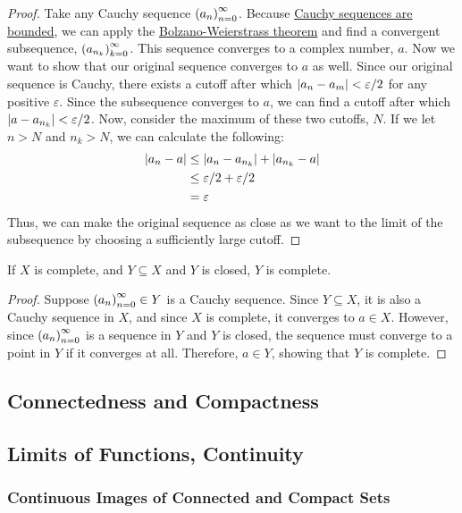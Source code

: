 \begin{proof}
Take any Cauchy sequence $\seq{a}$. Because \hyperlink{Cauchy Sequences are Bounded}{Cauchy sequences are bounded}, we can apply the \hyperlink{Bolzano-Weierstrass Theorem}{Bolzano-Weierstrass theorem} and find a convergent subsequence, $\seq{a}[n_k][k]$. This sequence converges to a complex number, $a$. Now we want to show that our original sequence converges to $a$ as well.
Since our original sequence is Cauchy, there exists a cutoff after which $\left\lvert a_n-a_m \right\rvert < \varepsilon/2$ for any positive $\varepsilon$. Since the subsequence converges to $a$, we can find a cutoff after which $\left\lvert a-a_{n_k} \right\rvert < \varepsilon/2$. Now, consider the maximum of these two cutoffs, $N$. If we let $n> N$ and $n_k>N$, we can calculate the following: 
\begin{align*}
\left\lvert a_n - a \right\rvert &\leq \left\lvert a_n-a_{n_k} \right\rvert + \left\lvert a_{n_k}-a \right\rvert\\ &\leq \varepsilon/2 +\varepsilon/2\\ &= \varepsilon
\end{align*}
Thus, we can make the original sequence as close as we want to the limit of the subsequence by choosing a sufficiently large cutoff.
\end{proof}
\begin{theorem}
If $X$ is complete, and $Y \subseteq X$ and $Y$ is closed, $Y$ is complete.
\end{theorem}
\begin{proof}
Suppose $\seq{a} \in Y$ is a Cauchy sequence. Since $Y \subseteq X$, it is also a Cauchy sequence in $X$, and since $X$ is complete, it converges to $a \in X$. However, since $\seq{a}$ is a sequence in $Y$ and $Y$ is closed, the sequence must converge to a point in $Y$ if it converges at all. Therefore, $a \in Y$, showing that $Y$ is complete.
\end{proof}
\subsection{Connectedness and Compactness}
\subsection{Limits of Functions, Continuity}
\subsubsection{Continuous Images of Connected and Compact Sets}
